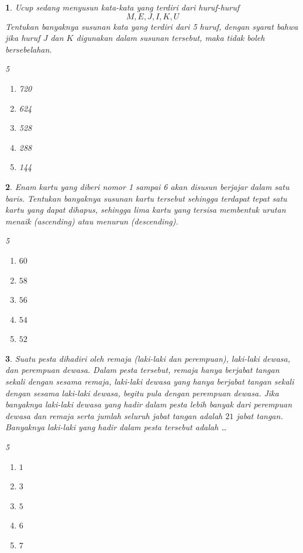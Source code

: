 \documentclass[11pt,a4paper,DIV=12]{scrartcl}
\theoremstyle{problemstyle}
\newtheorem{problem}{}
\theoremstyle{answerstyle}
\begin{document}
\begin{problem}
  Ucup sedang menyusun kata-kata yang terdiri dari huruf-huruf
  $$M,E,J,I,K,U$$
  Tentukan banyaknya susunan kata yang terdiri dari 5 huruf, dengan syarat bahwa jika huruf $J$ dan $K$ digunakan dalam susunan tersebut, maka tidak boleh bersebelahan.
  \begin{multicols}{5}
    \begin{enumerate}[label=(\Alph*)]
      \item 720
      \item 624
      \item 528
      \item 288
      \item 144
    \end{enumerate}
  \end{multicols}
\end{problem}

\begin{problem}
  Enam kartu yang diberi nomor 1 sampai 6 akan disusun berjajar dalam satu baris. Tentukan banyaknya susunan kartu tersebut sehingga terdapat tepat satu kartu yang dapat dihapus, sehingga lima kartu yang tersisa membentuk urutan menaik (ascending) atau menurun (descending).
  \begin{multicols}{5}
    \begin{enumerate}[label=(\Alph*)]
      \item $60$
      \item $58$
      \item $56$
      \item $54$
      \item $52$
    \end{enumerate}
  \end{multicols}
\end{problem}

\begin{problem}
  Suatu pesta dihadiri oleh remaja (laki-laki dan perempuan), laki-laki dewasa, dan perempuan dewasa. Dalam pesta tersebut, remaja hanya berjabat tangan sekali dengan sesama remaja, laki-laki dewasa yang hanya berjabat tangan sekali dengan sesama laki-laki dewasa, begitu pula dengan perempuan dewasa. Jika banyaknya laki-laki dewasa yang hadir dalam pesta lebih banyak dari perempuan dewasa dan remaja serta jumlah seluruh jabat tangan adalah $21$ jabat tangan. Banyaknya laki-laki yang hadir dalam pesta tersebut adalah \ldots
  \begin{multicols}{5}
    \begin{enumerate}[label=(\Alph*)]
      \item $1$
      \item $3$
      \item $5$
      \item $6$
      \item $7$
    \end{enumerate}
  \end{multicols}
\end{problem}
\end{document}
